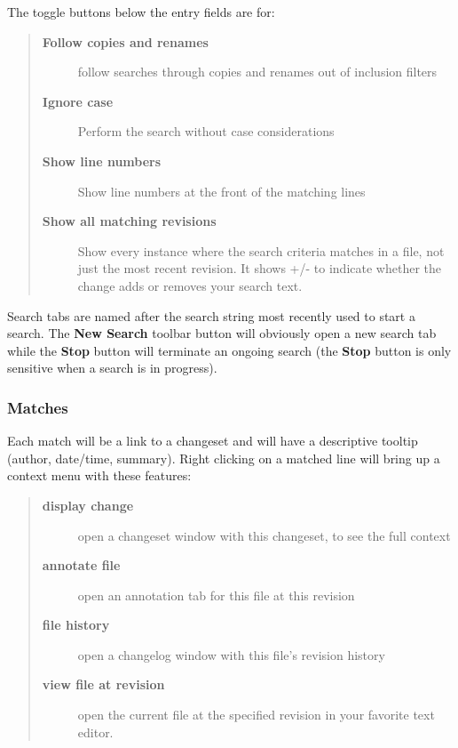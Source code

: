 \documentclass[letterpaper,10pt,english]{manual}
\begin{document}
The toggle buttons below the entry fields are for:
\begin{quote}
\begin{description}
\item[\textbf{Follow copies and renames}]
follow searches through copies and renames out of inclusion filters

\item[\textbf{Ignore case}]
Perform the search without case considerations

\item[\textbf{Show line numbers}]
Show line numbers at the front of the matching lines

\item[\textbf{Show all matching revisions}]
Show every instance where the search criteria matches in a file,
not just the most recent revision.  It shows +/- to indicate
whether the change adds or removes your search text.

\end{description}
\end{quote}

Search tabs are named after the search string most recently used to
start a search.  The \textbf{New Search} toolbar button will
obviously open a new search tab while the \textbf{Stop} button will
terminate an ongoing search (the \textbf{Stop} button is only
sensitive when a search is in progress).


\subsubsection{Matches}

Each match will be a link to a changeset and will have a descriptive
tooltip (author, date/time, summary).  Right clicking on a matched line
will bring up a context menu with these features:
\begin{quote}
\begin{description}
\item[\textbf{display change}]
open a changeset window with this changeset, to see the full context

\item[\textbf{annotate file}]
open an annotation tab for this file at this revision

\item[\textbf{file history}]
open a changelog window with this file's revision history

\item[\textbf{view file at revision}]
open the current file at the specified revision in your favorite
text editor.

\end{description}
\end{quote}
\end{document}
